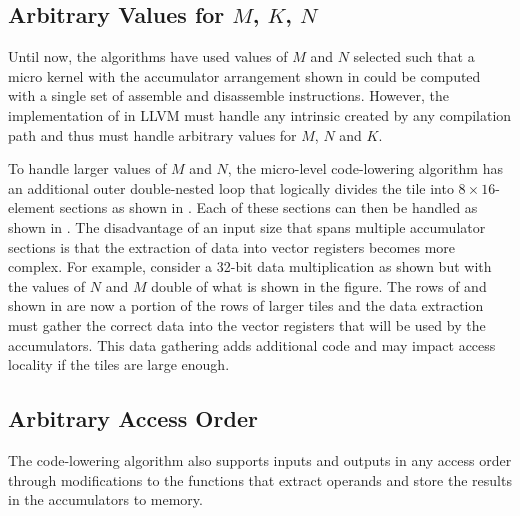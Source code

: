 \documentclass[\main/thesis.tex]{subfiles}
\begin{document}
\subsection{Arbitrary Values for \texorpdfstring{$M$}{M}, \texorpdfstring{$K$}{K}, \texorpdfstring{$N$}{N}}
\label{sec:arbitraryDims}
Until now, the algorithms have used values of $M$ and $N$ selected such that a micro kernel with the accumulator arrangement shown in  could be computed with a single set of assemble and disassemble instructions.
However, the implementation of  in LLVM must handle any  intrinsic created by any compilation path and thus must handle arbitrary values for $M$, $N$ and $K$.

To handle larger values of $M$ and $N$, the micro-level code-lowering algorithm has an additional outer double-nested loop that logically divides the  tile into $8 \times 16$-element sections as shown in .
Each of these sections can then be handled as shown in .
The disadvantage of an input size that spans multiple accumulator sections is that the extraction of data into vector registers becomes more complex.
For example, consider a 32-bit data multiplication as shown  but with the values of $N$ and $M$ double of what is shown in the figure.
The rows of  and  shown in  are now a portion of the rows of larger tiles and the data extraction must gather the correct data into the vector registers that will be used by the accumulators.
This data gathering adds additional code and may impact access locality if the tiles are large enough.

\subsection{Arbitrary Access Order}
\label{sec:arbitraryOrder}
The code-lowering algorithm also supports inputs and outputs in any access order through modifications to the functions that extract operands and store the results in the accumulators to memory.
\end{document}
